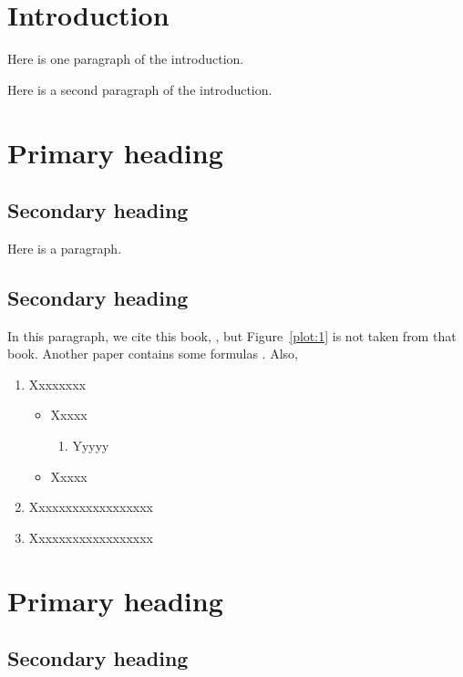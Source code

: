 \documentclass[a4paper,11pt]{style/uneceart}
\begin{document}


\section{Introduction}  %

Here is one paragraph of the introduction.

Here is a second paragraph of the introduction.

\section{Primary heading} 
\subsection{Secondary heading} \label{sc:A}
Here is a paragraph.


\subsection{Secondary heading} \label{sc:B}
In this paragraph, we cite this book,
\cite{Hundepoolea2012}, but Figure~\ref{plot:1} is not taken from that book. Another paper contains some formulas \citep[see][]{Zhou2010Smoothing}. Also,
\begin{enumerate}
\item Xxxxxxxx
\begin{itemize}
\item Xxxxx
\begin{enumerate}
\item Yyyyy
\end{enumerate}
\item Xxxxx
\end{itemize}
\item Xxxxxxxxxxxxxxxxxx
\item Xxxxxxxxxxxxxxxxxx
\end{enumerate}


\section{Primary heading}

\subsection{Secondary heading}
\end{document}
